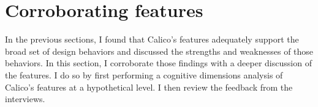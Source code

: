 \documentclass[12pt,fleqn]{ucithesis}
\begin{document}





\section{Corroborating features}
\label{discussion:corroborating-features}

In the previous sections, I found that Calico's features adequately support the broad set of design behaviors and discussed the strengths and weaknesses of those behaviors. In this section, I corroborate those findings with a deeper discussion of the features. I do so by first performing a cognitive dimensions analysis of Calico's features at a hypothetical level. I then review the feedback from the interviews.
\end{document}
